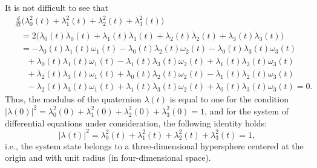 \documentclass[10pt,reqno]{amsart}
\theoremstyle{plain}
\theoremstyle{remark}
\begin{document}
It is not difficult to see that
\begin{align*}
  & \frac{d}{dt} \bigl( \lambda_0^2(t) + \lambda_1^2(t) + \lambda_2^2(t) + \lambda_3^2(t) \bigr) \\
  & \ \ \ = 2 \bigl( \lambda_0(t) \dot\lambda_0(t) + \lambda_1(t) \dot\lambda_1(t) + \lambda_2(t) \dot\lambda_2(t) + \lambda_3(t) \dot\lambda_3(t) \bigr) \\
  & \ \ \ = -\lambda_0(t) \lambda_1(t) \omega_1(t) - \lambda_0(t) \lambda_2(t) \omega_2(t) - \lambda_0(t) \lambda_3(t) \omega_3(t) \\
  & \ \ \ \ \ \ {} + \lambda_0(t) \lambda_1(t) \omega_1(t) - \lambda_1(t) \lambda_3(t) \omega_2(t) + \lambda_1(t) \lambda_2(t) \omega_3(t) \\
  & \ \ \ \ \ \ {} + \lambda_2(t) \lambda_3(t) \omega_1(t) + \lambda_0(t) \lambda_2(t) \omega_2(t) - \lambda_1(t) \lambda_2(t) \omega_3(t) \\
  & \ \ \ \ \ \ {} - \lambda_2(t) \lambda_3(t) \omega_1(t) + \lambda_1(t) \lambda_3(t) \omega_2(t) + \lambda_0(t) \lambda_3(t) \omega_3(t) = 0.
\end{align*}
Thus, the modulus of the quaternion $\lambda(t)$ is equal to one for the condition $|\lambda(0)|^2 = \lambda_0^2(0) + \lambda_1^2(0) + \lambda_2^2(0) + \lambda_3^2(0) = 1$, and for the system of differential equations under consideration, the following identity holds:
\begin{equation}\label{eqQuaternion}
  |\lambda(t)|^2 = \lambda_0^2(t) + \lambda_1^2(t) + \lambda_2^2(t) + \lambda_3^2(t) = 1,
\end{equation}
i.e., the system state belongs to a three-dimensional hypersphere centered at the origin and with unit radius (in four-dimensional space).
\end{document}
